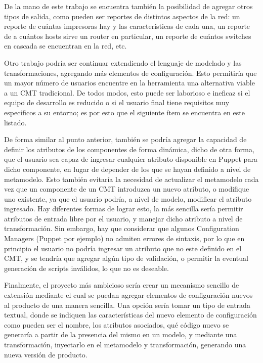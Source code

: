 De la mano de este trabajo se encuentra también la posibilidad de agregar otros tipos de salida, como pueden ser reportes de distintos aspectos de la red: un reporte de cuántas impresoras hay y las características de cada una, un reporte de a cuántos hosts sirve un router en particular, un reporte de cuántos switches en cascada se encuentran en la red, etc. 

Otro trabajo podría ser continuar extendiendo el lenguaje de modelado y las transformaciones, agregando más elementos de configuración. Esto permitiría que un mayor número de usuarios encuentre en la herramienta una alternativa viable a un CMT tradicional. De todos modos, esto puede ser laborioso e ineficaz si el equipo de desarrollo es reducido o si el usuario final tiene requisitos muy específicos a su entorno; es por esto que el siguiente ítem se encuentra en este listado.

De forma similar al punto anterior, también se podría agregar la capacidad de definir los atributos de los componentes de forma dinámica, dicho de otra forma, que el usuario sea capaz de ingresar cualquier atributo disponible en Puppet para dicho componente, en lugar de depender de los que se hayan definido a nivel de metamodelo. Esto también evitaría la necesidad de actualizar el metamodelo cada vez que un componente de un CMT introduzca un nuevo atributo, o modifique uno existente, ya que el usuario podría, a nivel de modelo, modificar el atributo ingresado.
Hay diferentes formas de lograr esto, la más sencilla sería permitir atributos de entrada libre por el usuario, y manejar dicho atributo a nivel de transformación. Sin embargo, hay que considerar que algunos Configuration Managers (Puppet por ejemplo) no admiten errores de sintaxis, por lo que en principio el usuario no podría ingresar un atributo que no este definido en el CMT, y se tendría que agregar algún tipo de validación, o permitir la eventual generación de scripts inválidos, lo que no es deseable.

Finalmente, el proyecto más ambicioso sería crear un mecanismo sencillo de extensión mediante el cual se puedan agregar elementos de configuración nuevos al producto de una manera sencilla. Una opción sería tomar un tipo de entrada textual, donde se indiquen las características del nuevo elemento de configuración como pueden ser el nombre, los atributos asociados, qué código nuevo se generaría a partir de la presencia del mismo en un modelo, y mediante una transformación, inyectarlo en el metamodelo y transformación, generando una nueva versión de producto.
